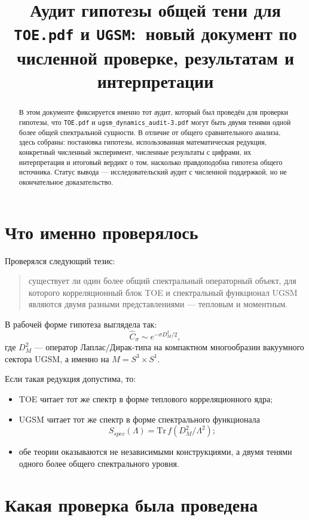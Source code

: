 \documentclass[12pt,a4paper]{article}
\title{Аудит гипотезы общей тени для \texttt{TOE.pdf} и \texttt{UGSM}:\
новый документ по численной проверке, результатам и интерпретации}
\author{}
\date{}
\begin{document}
\maketitle

\begin{abstract}
В этом документе фиксируется именно тот аудит, который был проведён для проверки гипотезы, что \texttt{TOE.pdf} и \texttt{ugsm\_dynamics\_audit-3.pdf} могут быть двумя тенями одной более общей спектральной сущности. В отличие от общего сравнительного анализа, здесь собраны: постановка гипотезы, использованная математическая редукция, конкретный численный эксперимент, численные результаты с цифрами, их интерпретация и итоговый вердикт о том, насколько правдоподобна гипотеза общего источника. Статус вывода --- исследовательский аудит с численной поддержкой, но не окончательное доказательство.
\end{abstract}

\section{Что именно проверялось}

Проверялся следующий тезис:
\begin{quote}
существует ли один более общий спектральный операторный объект, для которого корреляционный блок TOE и спектральный функционал UGSM являются двумя разными представлениями --- тепловым и моментным.
\end{quote}

В рабочей форме гипотеза выглядела так:
\begin{equation}
\hat C_\sigma \sim e^{-\sigma D_M^2/2},
\end{equation}
где \(D_M^2\) --- оператор Лаплас/Дирак-типа на компактном многообразии вакуумного сектора UGSM, а именно на \(M=S^3\times S^1\).

Если такая редукция допустима, то:
\begin{itemize}
    \item TOE читает тот же спектр в форме теплового корреляционного ядра;
    \item UGSM читает тот же спектр в форме спектрального функционала
    \[
    S_{spec}(\Lambda)=\mathrm{Tr}\,f(D_M^2/\Lambda^2);
    \]
    \item обе теории оказываются не независимыми конструкциями, а двумя тенями одного более общего спектрального уровня.
\end{itemize}

\section{Какая проверка была проведена}
\end{document}
